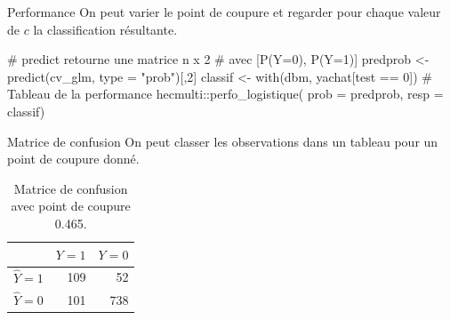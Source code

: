 \documentclass[
  ignorenonframetext,
]{beamer}
\newenvironment{Shaded}{\begin{snugshade}}{\end{snugshade}}
\newcommand{\AttributeTok}[1]{\textcolor[rgb]{0.40,0.45,0.13}{#1}}
\newcommand{\CommentTok}[1]{\textcolor[rgb]{0.37,0.37,0.37}{#1}}
\newcommand{\DecValTok}[1]{\textcolor[rgb]{0.68,0.00,0.00}{#1}}
\newcommand{\FunctionTok}[1]{\textcolor[rgb]{0.28,0.35,0.67}{#1}}
\newcommand{\NormalTok}[1]{\textcolor[rgb]{0.00,0.23,0.31}{#1}}
\newcommand{\OtherTok}[1]{\textcolor[rgb]{0.00,0.23,0.31}{#1}}
\newcommand{\SpecialCharTok}[1]{\textcolor[rgb]{0.37,0.37,0.37}{#1}}
\newcommand{\StringTok}[1]{\textcolor[rgb]{0.13,0.47,0.30}{#1}}
\begin{document}
\begin{frame}[fragile]{Performance}
\protect\hypertarget{performance}{}
On peut varier le point de coupure et regarder pour chaque valeur de
\(c\) la classification résultante.

\begin{Shaded}
\begin{Highlighting}[numbers=left,,]
\CommentTok{\# predict retourne une matrice n x 2 }
\CommentTok{\# avec [P(Y=0), P(Y=1)]}
\NormalTok{predprob }\OtherTok{\textless{}{-}} \FunctionTok{predict}\NormalTok{(cv\_glm, }\AttributeTok{type =} \StringTok{"prob"}\NormalTok{)[,}\DecValTok{2}\NormalTok{]}
\NormalTok{classif }\OtherTok{\textless{}{-}} \FunctionTok{with}\NormalTok{(dbm, yachat[test }\SpecialCharTok{==} \DecValTok{0}\NormalTok{])}
\CommentTok{\# Tableau de la performance}
\NormalTok{hecmulti}\SpecialCharTok{::}\FunctionTok{perfo\_logistique}\NormalTok{(}
  \AttributeTok{prob =}\NormalTok{ predprob,}
  \AttributeTok{resp =}\NormalTok{ classif)}
\end{Highlighting}
\end{Shaded}
\end{frame}

\begin{frame}{Matrice de confusion}
\protect\hypertarget{matrice-de-confusion}{}
On peut classer les observations dans un tableau pour un point de
coupure donné.

\hypertarget{tbl-confumat}{}
\begin{table}
\caption{\label{tbl-confumat}Matrice de confusion avec point de coupure 0.465. }\tabularnewline

\centering
\begin{tabular}{lrr}
\toprule
  & \(Y=1\) & \(Y=0\)\\
\midrule
\(\widehat{Y}=1\) & 109 & 52\\
\(\widehat{Y}=0\) & 101 & 738\\
\bottomrule
\end{tabular}
\end{table}
\end{frame}
\end{document}
